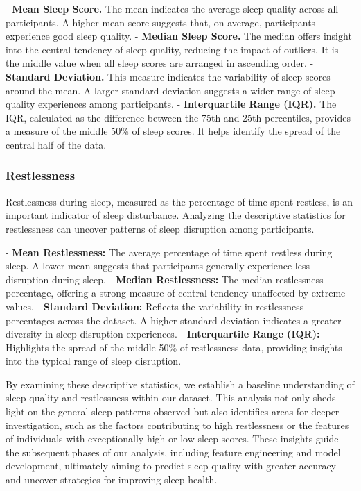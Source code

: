 \documentclass[10pt]{extarticle}
\begin{document}
- \textbf{Mean Sleep Score.} The mean indicates the average sleep quality across all participants. A higher mean score suggests that, on average, participants experience good sleep quality.
- \textbf{Median Sleep Score.} The median offers insight into the central tendency of sleep quality, reducing the impact of outliers. It is the middle value when all sleep scores are arranged in ascending order.
- \textbf{Standard Deviation.} This measure indicates the variability of sleep scores around the mean. A larger standard deviation suggests a wider range of sleep quality experiences among participants.
- \textbf{Interquartile Range (IQR).} The IQR, calculated as the difference between the 75th and 25th percentiles, provides a measure of the middle 50\% of sleep scores. It helps identify the spread of the central half of the data.

\subsubsection{Restlessness}

Restlessness during sleep, measured as the percentage of time spent restless, is an important indicator of sleep disturbance. Analyzing the descriptive statistics for restlessness can uncover patterns of sleep disruption among participants.

- \textbf{Mean Restlessness:} The average percentage of time spent restless during sleep. A lower mean suggests that participants generally experience less disruption during sleep.
- \textbf{Median Restlessness:} The median restlessness percentage, offering a strong measure of central tendency unaffected by extreme values.
- \textbf{Standard Deviation:} Reflects the variability in restlessness percentages across the dataset. A higher standard deviation indicates a greater diversity in sleep disruption experiences.
- \textbf{Interquartile Range (IQR):} Highlights the spread of the middle 50\% of restlessness data, providing insights into the typical range of sleep disruption.

By examining these descriptive statistics, we establish a baseline understanding of sleep quality and restlessness within our dataset. This analysis not only sheds light on the general sleep patterns observed but also identifies areas for deeper investigation, such as the factors contributing to high restlessness or the features of individuals with exceptionally high or low sleep scores. These insights guide the subsequent phases of our analysis, including feature engineering and model development, ultimately aiming to predict sleep quality with greater accuracy and uncover strategies for improving sleep health.
\end{document}
